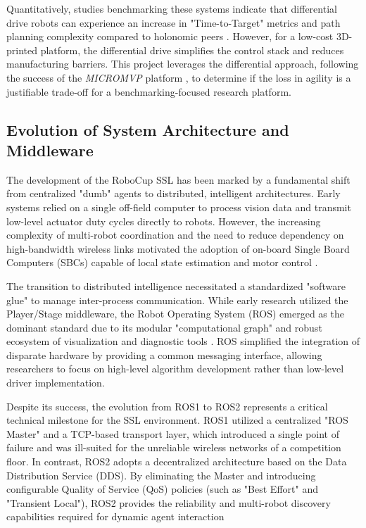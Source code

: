 \documentclass[a4paper,twoside,12pt]{report}
\begin{document}
Quantitatively, studies benchmarking these systems indicate that differential drive robots can experience an increase in "Time-to-Target" metrics and path planning complexity compared to holonomic peers \cite{chavan2015design}. 
However, for a low-cost 3D-printed platform, the differential drive simplifies the control stack and reduces manufacturing barriers. 
This project leverages the differential approach, following the success of the \textit{MICROMVP} platform \cite{yu2017portable}, to determine if the loss in agility is a justifiable trade-off for a benchmarking-focused research platform.

\subsection{Evolution of System Architecture and Middleware}

The development of the RoboCup SSL has been marked by a fundamental shift from centralized "dumb" agents to distributed, intelligent architectures. 
Early systems relied on a single off-field computer to process vision data and transmit low-level actuator duty cycles directly to robots. 
However, the increasing complexity of multi-robot coordination and the need to reduce dependency on high-bandwidth wireless links motivated the adoption of on-board Single Board Computers (SBCs) capable of local state estimation and motor control \cite{smit2011development}.

The transition to distributed intelligence necessitated a standardized "software glue" to manage inter-process communication. 
While early research utilized the Player/Stage middleware, the Robot Operating System (ROS) emerged as the dominant standard due to its modular "computational graph" and robust ecosystem of visualization and diagnostic tools \cite{joseph2018robot}. 
ROS simplified the integration of disparate hardware by providing a common messaging interface, allowing researchers to focus on high-level algorithm development rather than low-level driver implementation.

Despite its success, the evolution from ROS1 to ROS2 represents a critical technical milestone for the SSL environment. 
ROS1 utilized a centralized "ROS Master" and a TCP-based transport layer, which introduced a single point of failure and was ill-suited for the unreliable wireless networks of a competition floor. 
In contrast, ROS2 adopts a decentralized architecture based on the Data Distribution Service (DDS). 
By eliminating the Master and introducing configurable Quality of Service (QoS) policies (such as "Best Effort" and "Transient Local"), ROS2 provides the reliability and multi-robot discovery capabilities required for dynamic agent interaction \cite{macenski2022robot}
\end{document}
